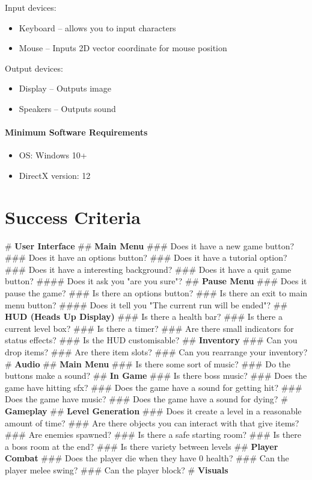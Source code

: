 \documentclass{article}
\begin{document}
Input devices:
\begin{itemize}
\item Keyboard – allows you to input characters 
\item Mouse – Inputs 2D vector coordinate for mouse position 
\end{itemize}

Output devices:
\begin{itemize}
\item Display – Outputs image 
\item Speakers – Outputs sound 
\end{itemize}

\paragraph{Minimum Software Requirements}
\begin{itemize}
\item OS: Windows 10+   
\item DirectX version: 12   
\end{itemize}

\section{Success Criteria}
\begin{easylist}
# \large{\textbf{User Interface}}
## \textbf{Main Menu}
### Does it have a new game button?
### Does it have an options button?
### Does it have a tutorial option?
### Does it have a interesting background?
### Does it have a quit game button?
#### Does it ask you "are you sure"?
## \textbf{Pause Menu}
### Does it pause the game?
### Is there an options button?
### Is there an exit to main menu button?
#### Does it tell you "The current run will be ended"?
## \textbf{HUD (Heads Up Display)}
### Is there a health bar?
### Is there a current level box?
### Is there a timer?
### Are there small indicators for status effects?
### Is the HUD customisable?
## \textbf{Inventory}
### Can you drop items?
### Are there item slots?
### Can you rearrange your inventory?
# \large{\textbf{Audio}}
## \textbf{Main Menu}
### Is there some sort of music?
### Do the buttons make a sound?
## \textbf{In Game}
### Is there boss music?
### Does the game have hitting sfx?
### Does the game have a sound for getting hit?
### Does the game have music?
### Does the game have a sound for dying?
# \large{\textbf{Gameplay}}
## \textbf{Level Generation}
### Does it create a level in a reasonable amount of time?
### Are there objects you can interact with that give items?
### Are enemies spawned?
### Is there a safe starting room?
### Is there a boss room at the end?
### Is there variety between levels
## \textbf{Player Combat}
### Does the player die when they have 0 health?
### Can the player melee swing?
### Can the player block?
# \large{\textbf{Visuals}}
\end{easylist}
\end{document}
